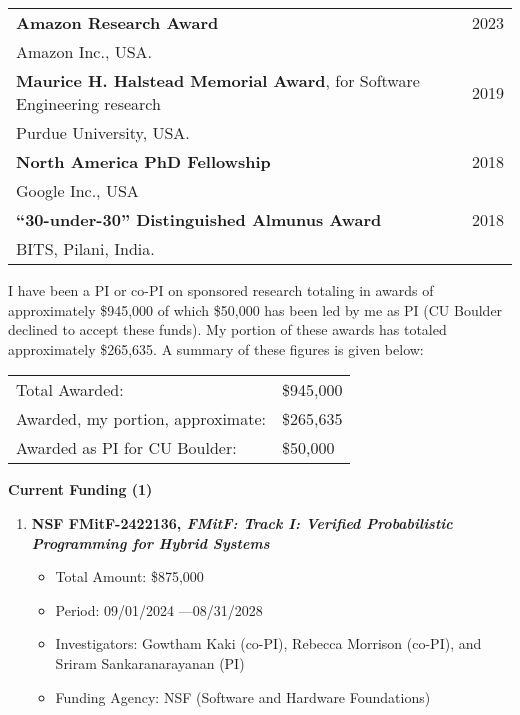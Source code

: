 \documentclass{article}
\begin{document}
\begin{center}
  \begin{tabular}{ p{15cm}  r }
{\bf Amazon Research Award} & 2023 \\ [3pt]
\hspace{2em} Amazon Inc., USA. &
\\[6pt]
%
{\bf Maurice H. Halstead Memorial Award}, for Software
Engineering research & 2019 \\ [3pt]
\hspace{2em} Purdue University, USA. &
\\[6pt]
%
{\bf North America PhD Fellowship}& 2018 \\ [3pt]
\hspace{2em} Google Inc., USA &
\\[6pt]
%
{\bf ``30-under-30'' Distinguished Almunus Award} & 2018\\ [3pt]
    \hspace{2em} BITS, Pilani, India. & \\[6pt]
   \end{tabular}
\end{center}


\vspace{1em}
\noindent I have been a PI or co-PI on sponsored research totaling in
awards of approximately \$945,000 of which \$50,000 has been led by me as
PI (CU Boulder declined to accept these funds). My portion of these awards
has totaled approximately \$265,635. A summary of these figures is given
below:

\vspace{1em}
\begin{tabular}{p{8cm}  l}
  Total Awarded: &  \$945,000\\
  Awarded, my portion, approximate:& \$265,635 \\
  Awarded as PI for CU Boulder:& \$50,000  
\end{tabular}

\medskip

\noindent\textbf{Current Funding (1)}

\begin{enumerate}

\item {\bf NSF FMitF-2422136, \emph{FMitF: Track I: Verified Probabilistic Programming for Hybrid Systems}}
\begin{itemize}
  \item 
    Total Amount: \$875,000
  \item 
    Period: 09/01/2024 ---08/31/2028
\item 
    Investigators: Gowtham Kaki (co-PI), Rebecca Morrison (co-PI), and
    Sriram Sankaranarayanan (PI)
\item 
Funding Agency: NSF (Software and Hardware Foundations)
\end{itemize}  
\end{enumerate}
\end{document}
